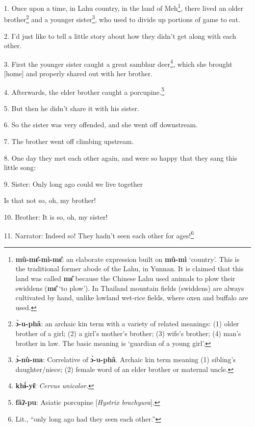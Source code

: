 \setcounter{footnote}{0}

1. Once upon a time, in Lahu country, in the land of Meh\footnote{\textbf{mû-mɛ̂-mì-mɛ̂}: an elaborate expression built on \textbf{mû-mì} `country'. This is the traditional former abode of the Lahu, in Yunnan. It is claimed that this land was called \textbf{mɛ̂} because the Chinese Lahu used animals to plow their swiddens (\textbf{mɛ̂} `to plow'). In Thailand mountain fields (swiddens) are always cultivated by hand, unlike lowland wet-rice fields, where oxen and buffalo are used.}, there lived an older
brother\footnote{\textbf{ɔ̀-u-phâ}: an archaic kin term with a variety of related meanings: (1) older brother of a girl; (2) a girl's mother's brother; (3) wife's brother; (4) man's brother in law. The basic meaning is `guardian of a young girl'.} and a younger sister\footnote{\textbf{ɔ̀-nù-ma}: Correlative of \textbf{ɔ̀-u-phâ}. Archaic kin term meaning (1) sibling's daughter/niece; (2) female word of an elder brother or maternal uncle.}, who used to divide up portions of game to
eat.

2. I'd just like to tell a little story about how they didn't get along with each
other.

3. First the younger sister caught a great sambhur deer\footnote{\textbf{khɨ́-yɨ̄}: \textit{Cervus unicolor.}}, which she brought
[home] and properly shared out with her brother.

4. Afterwards, the elder brother caught a porcupine.\footnote{\textbf{fâʔ-pu}: Asiatic porcupine [\textit{Hystrix brachyura}].}

5. But then he didn't share it with his sister.

6. So the sister was very offended, and she went off downstream.

7. The brother went off climbing upstream.

8. One day they met each other again, and were so happy that they sang this little
song:

9. Sister: Only long ago could we live together

Is that not so, oh, my brother!

10. Brother: It is so, oh, my sister!

11. Narrator: Indeed so! They hadn't seen each other for ages!\footnote{Lit., ``only long ago had they seen each other.''}

